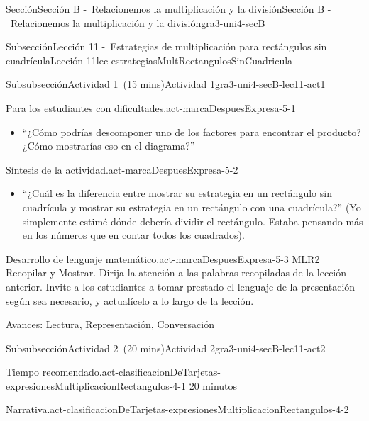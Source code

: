 \documentclass[oneside,10pt,]{article}
\begin{document}
\begin{sectionptx}{Sección}{Sección B -~Relacionemos la multiplicación y la división}{}{Sección B -~Relacionemos la multiplicación y la división}{}{}{gra3-uni4-secB}
\begin{subsectionptx}{Subsección}{Lección 11 -~Estrategias de multiplicación para rectángulos sin cuadrícula}{}{Lección 11}{}{}{lec-estrategiasMultRectangulosSinCuadricula}
\begin{subsubsectionptx}{Subsubsección}{Actividad 1~(15 mins)}{}{Actividad 1}{}{}{gra3-uni4-secB-lec11-act1}
\begin{paragraphs}{Para los estudiantes con dificultades.}{act-marcaDespuesExpresa-5-1}
\begin{itemize}[label=\textbullet]
\item{}``¿Cómo podrías descomponer uno de los factores para encontrar el producto? ¿Cómo mostrarías eso en el diagrama?''%
\end{itemize}
\end{paragraphs}%
\begin{paragraphs}{Síntesis de la actividad.}{act-marcaDespuesExpresa-5-2}%
%
\begin{itemize}[label=\textbullet]
\item{}``¿Cuál es la diferencia entre mostrar su estrategia en un rectángulo sin cuadrícula y mostrar su estrategia en un rectángulo con una cuadrícula?'' (Yo simplemente estimé dónde debería dividir el rectángulo. Estaba pensando más en los números que en contar todos los cuadrados).%
\end{itemize}
\end{paragraphs}%
\begin{paragraphs}{Desarrollo de lenguaje matemático.}{act-marcaDespuesExpresa-5-3}%
MLR2 Recopilar y Mostrar. Dirija la atención a las palabras recopiladas de la lección anterior. Invite a los estudiantes a tomar prestado el lenguaje de la presentación según sea necesario, y actualícelo a lo largo de la lección.%
\par
Avances: Lectura, Representación, Conversación%
\end{paragraphs}%
\end{subsubsectionptx}
%
%
\typeout{************************************************}
\typeout{************************************************}
%
\begin{subsubsectionptx}{Subsubsección}{Actividad 2~(20 mins)}{}{Actividad 2}{}{}{gra3-uni4-secB-lec11-act2}
\par
\begin{paragraphs}{Tiempo recomendado.}{act-clasificacionDeTarjetas-expresionesMultiplicacionRectangulos-4-1}%
20 minutos%
\end{paragraphs}%
\begin{paragraphs}{Narrativa.}{act-clasificacionDeTarjetas-expresionesMultiplicacionRectangulos-4-2}%

\end{paragraphs}
\end{subsubsectionptx}
\end{subsectionptx}
\end{sectionptx}
\end{document}
